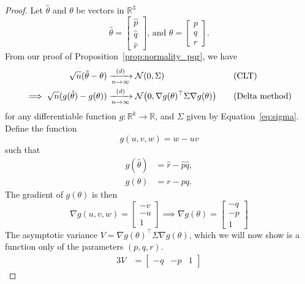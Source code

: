 \documentclass[letterpaper, reqno]{amsart}
\numberwithin{equation}{section}
\newcommand{\T}{\top} %
\newcommand{\R}{\mathbb{R}}  %
\newcommand{\N}[2]{\mathcal{N}\mleft( #1, #2 \mright)}
\newcommand{\by}[1]{&\quad&\text{(#1)}}
\newcommand{\Dlim}{\xrightarrow[n \to \infty]{(d)}}
\newcommand{\phat}{\hat{p}}
\newcommand{\qhat}{\hat{q}}
\newcommand{\rhat}{\hat{r}}
\begin{document}
\begin{proof}
  Let $\hat{\theta}$ and $\theta$ be vectors in $\R^3$
  \begin{equation*}
    \hat{\theta} = \begin{bmatrix} \phat \\ \qhat \\ \rhat \end{bmatrix} \text{, and } 
    \theta = \begin{bmatrix} p \\ q \\ r \end{bmatrix}.
  \end{equation*}
  From our proof of Proposition~\ref{prop:normality_pqr}, we have
  \begin{alignat*}{3}
    \sqrt{n}(\hat{\theta} - \theta) &\Dlim \N{0}{\Sigma} \by{CLT} \\
    \implies \sqrt{n}(g(\hat{\theta}) - g(\theta)) &\Dlim \N{0}{\nabla g(\theta)^\T \Sigma
      \nabla g(\theta)} \by{Delta method}
  \end{alignat*}
  for any differentiable function $g \colon \R^k \to \R$, and $\Sigma$ given by
  Equation~\eqref{eq:sigma}. 
  Define the function 
  \begin{equation} \label{eq:g}
    g(u, v, w) = w - uv
  \end{equation}
  such that 
  \begin{align*}
    g(\hat{\theta}) &= \rhat - \phat\qhat, \\
    g(\theta) &= r - pq.
  \end{align*}
  The gradient of $g(\theta)$ is then
  \begin{equation}
    \nabla g(u,v,w) = \begin{bmatrix} -v \\ -u \\ 1 \end{bmatrix} 
    \implies \nabla g(\theta) = \begin{bmatrix} -q \\ -p \\ 1 \end{bmatrix}
  \end{equation}
  The asymptotic variance $V = \nabla g(\theta)^\T \Sigma \nabla g(\theta)$,
  which we will now show is a function only of the parameters $(p, q, r)$.
  \begin{alignat*}{3}
    V &= \begin{bmatrix} -q & -p & 1 \end{bmatrix} 

\end{alignat*}
\end{proof}
\end{document}

